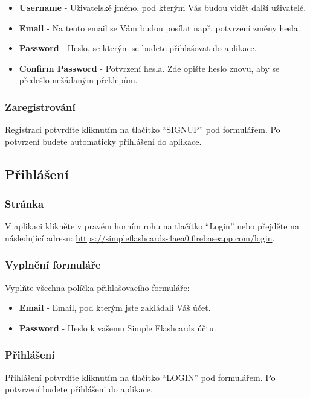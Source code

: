 \documentclass[a4paper,12pt]{article}
\begin{document}
\begin{itemize}
	\item \textbf{Username} - Uživatelské jméno, pod kterým Vás budou vidět další uživatelé. 
	\item \textbf{Email} - Na tento email se Vám budou posílat např. potvrzení změny hesla.
	\item \textbf{Password} - Heslo, se kterým se budete přihlašovat do aplikace.
	\item \textbf{Confirm Password} - Potvrzení hesla. Zde opište heslo znovu, aby se předešlo nežádaným překlepům.
\end{itemize}

\subsubsection*{Zaregistrování}
Registraci potvrdíte kliknutím na tlačítko \enquote{SIGNUP} pod formulářem. Po potvrzení budete automaticky přihlášeni do aplikace.

\subsection{Přihlášení}
\subsubsection*{Stránka}
V aplikaci klikněte v pravém horním rohu na tlačítko \enquote{Login} nebo přejděte na následující adresu:  \href{https://simpleflashcards-4aea0.firebaseapp.com/login}{https://simpleflashcards-4aea0.firebaseapp.com/login}.

\subsubsection*{Vyplnění formuláře}
Vyplňte všechna políčka přihlašovacího formuláře:

\begin{itemize}
	\item \textbf{Email } - Email, pod kterým jste zakládali Váš účet.
	\item \textbf{Password } - Heslo k vašemu Simple Flashcards účtu.
\end{itemize}

\subsubsection*{Přihlášení}
Přihlášení potvrdíte kliknutím na tlačítko \enquote{LOGIN} pod formulářem. Po potvrzení budete přihlášeni do aplikace.
\end{document}
